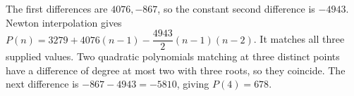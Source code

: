 The first differences are $4076,-867$, so the constant second difference is $-4943$. Newton interpolation gives $P(n)=3279+4076(n-1)-\dfrac{4943}{2}(n-1)(n-2)$. It matches all three supplied values. Two quadratic polynomials matching at three distinct points have a difference of degree at most two with three roots, so they coincide. The next difference is $-867-4943=-5810$, giving $P(4)=\boxed{678}$.
